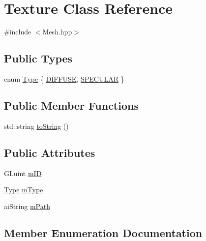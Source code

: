 \hypertarget{classTexture}{}\section{Texture Class Reference}
\label{classTexture}


{\ttfamily \#include $<$Mesh.\+hpp$>$}

\subsection*{Public Types}
\begin{DoxyCompactItemize}
\item 
enum \hyperlink{classTexture_a9d0b09cfb795f9553db6a4eab396bef9}{Type} \{ \hyperlink{classTexture_a9d0b09cfb795f9553db6a4eab396bef9a30c8ec5c46cfae607655ca4b913b87df}{D\+I\+F\+F\+U\+SE}, 
\hyperlink{classTexture_a9d0b09cfb795f9553db6a4eab396bef9a0dd9b82cf1e92a09e1a78bd0014cbbea}{S\+P\+E\+C\+U\+L\+AR}
 \}
\end{DoxyCompactItemize}
\subsection*{Public Member Functions}
\begin{DoxyCompactItemize}
\item 
std\+::string \hyperlink{classTexture_aac49cba59991aaab1c2d6e6d186beefb}{to\+String} ()
\end{DoxyCompactItemize}
\subsection*{Public Attributes}
\begin{DoxyCompactItemize}
\item 
G\+Luint \hyperlink{classTexture_ad34618c2c7f986a956453d1208a1912b}{m\+ID}
\item 
\hyperlink{classTexture_a9d0b09cfb795f9553db6a4eab396bef9}{Type} \hyperlink{classTexture_a25fca6d1c32a423f83decd7f738864ce}{m\+Type}
\item 
ai\+String \hyperlink{classTexture_a637c7fd5c6fab7b1b2cbc91d8b5a9bba}{m\+Path}
\end{DoxyCompactItemize}


\subsection{Member Enumeration Documentation}
